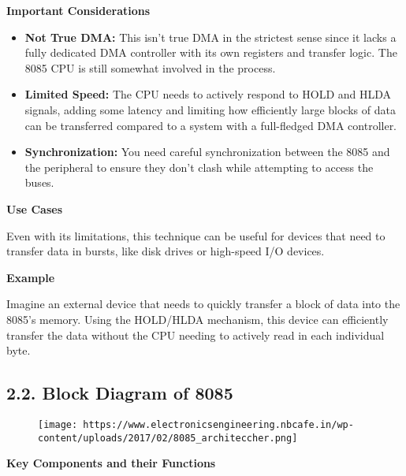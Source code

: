 \documentclass[
]{article}
\begin{document}
\textbf{Important Considerations}

\begin{itemize}
\item
  \textbf{Not True DMA:} This isn't true DMA in the strictest sense
  since it lacks a fully dedicated DMA controller with its own registers
  and transfer logic. The 8085 CPU is still somewhat involved in the
  process.
\item
  \textbf{Limited Speed:} The CPU needs to actively respond to HOLD and
  HLDA signals, adding some latency and limiting how efficiently large
  blocks of data can be transferred compared to a system with a
  full-fledged DMA controller.
\item
  \textbf{Synchronization:} You need careful synchronization between the
  8085 and the peripheral to ensure they don't clash while attempting to
  access the buses.
\end{itemize}

\textbf{Use Cases}

Even with its limitations, this technique can be useful for devices that
need to transfer data in bursts, like disk drives or high-speed I/O
devices.

\textbf{Example}

Imagine an external device that needs to quickly transfer a block of
data into the 8085's memory. Using the HOLD/HLDA mechanism, this device
can efficiently transfer the data without the CPU needing to actively
read in each individual byte.

\hypertarget{22-block-diagram-of-8085}{%
\subsection{2.2. Block Diagram of 8085}\label{22-block-diagram-of-8085}}

\begin{figure}
\centering
\texttt{[image: https://www.electronicsengineering.nbcafe.in/wp-content/uploads/2017/02/8085\_architeccher.png]}
\caption{}
\end{figure}

\textbf{Key Components and their Functions}
\end{document}
